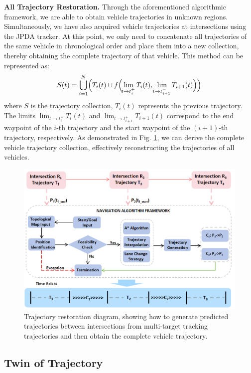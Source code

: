 \documentclass[lettersize,journal]{IEEEtran}
\begin{document}
\textbf{All Trajectory Restoration.}
Through the aforementioned algorithmic framework, we are able to obtain vehicle trajectories in unknown regions. 
Simultaneously, we have also acquired vehicle trajectories at intersections using the JPDA tracker. 
At this point, we only need to concatenate all trajectories of the same vehicle in chronological order and place them into a new collection, thereby obtaining the complete trajectory of that vehicle. 
This method can be represented as: 
\begin{align}
	S(t) = \bigcup_{i=1}^{N} \Bigl( T_i(t) \cup f\Bigl( \lim_{\!t \to t_i^+} T_i(t), \lim_{\!t \to t_{i+1}^-} T_{i+1}(t) \Bigr) \Bigr)
\end{align}
where \(S\) is the trajectory collection, \(T_i(t)\) represents the previous trajectory. 
The limits \(\lim_{t \to t_i^+} T_i(t)\) and \(\lim_{t \to t_{i+1}^+} T_{i+1}(t)\) correspond to the end waypoint of the \(i\)-th trajectory and the start waypoint of the \((i+1)\)-th trajectory, respectively.
As demonstrated in Fig. \ref{fig:5}, we can derive the complete vehicle trajectory collection, effectively reconstructing the trajectories of all vehicles.
\begin{figure}[t]
	\centering
	\includegraphics[width=\linewidth]{picture/picture5.png} 
	\caption{Trajectory restoration diagram, showing how to generate predicted trajectories between intersections from multi-target tracking trajectories and then obtain the complete vehicle trajectory.} 
	\label{fig:5} 
\end{figure}

\subsection{Twin of Trajectory}
\end{document}
